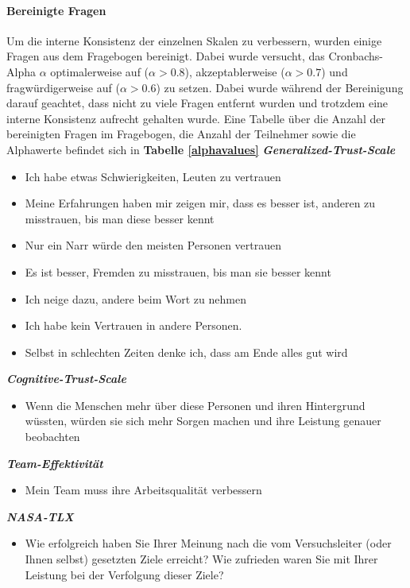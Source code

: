 \documentclass[a4paper,11pt]{article}%
\renewcommand{\\}{\vspace*{0.5\baselineskip} \newline}
\begin{document}
			\paragraph{Bereinigte Fragen}
Um die interne Konsistenz der einzelnen Skalen zu verbessern, wurden einige Fragen aus dem Fragebogen bereinigt. Dabei wurde versucht, das Cronbachs-Alpha $\alpha$ optimalerweise auf ($\alpha > 0.8$), akzeptablerweise ($\alpha > 0.7$) und fragwürdigerweise auf ($\alpha > 0.6$) zu setzen. Dabei wurde während der Bereinigung darauf geachtet, dass nicht zu viele Fragen entfernt wurden und trotzdem eine interne Konsistenz aufrecht gehalten wurde. Eine Tabelle über die Anzahl der bereinigten Fragen im Fragebogen, die Anzahl der Teilnehmer sowie die Alphawerte befindet sich in \textbf{Tabelle \ref{alphavalues}} \\
\textbf{\textit{Generalized-Trust-Scale}}
\begin{itemize}
	\item Ich habe etwas Schwierigkeiten, Leuten zu vertrauen
	\item Meine Erfahrungen haben mir zeigen mir, dass es besser ist, anderen zu misstrauen, bis man diese besser kennt
	\item Nur ein Narr würde den meisten Personen vertrauen
	\item Es ist besser, Fremden zu misstrauen, bis man sie besser kennt
	\item Ich neige dazu, andere beim Wort zu nehmen
	\item Ich habe kein Vertrauen in andere Personen.
	\item Selbst in schlechten Zeiten denke ich, dass am Ende alles gut wird
\end{itemize}

\textbf{\textit{Cognitive-Trust-Scale}}
\begin{itemize}
	\item Wenn die Menschen mehr über diese Personen und ihren Hintergrund wüssten, würden sie sich mehr Sorgen machen und ihre Leistung genauer beobachten
\end{itemize}

\textbf{\textit{Team-Effektivität}}
\begin{itemize}
	\item Mein Team muss ihre Arbeitsqualität verbessern
\end{itemize}

\textbf{\textit{NASA-TLX}}
\begin{itemize}
	\item Wie erfolgreich haben Sie Ihrer Meinung nach die vom Versuchsleiter (oder Ihnen selbst) gesetzten Ziele erreicht? Wie zufrieden waren Sie mit Ihrer Leistung bei der Verfolgung dieser Ziele? 
\end{itemize}
\end{document}
